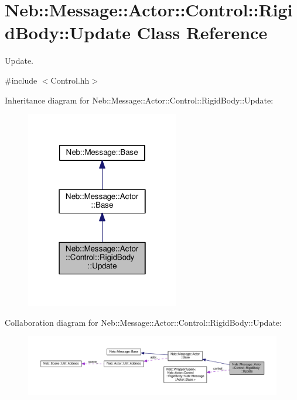 \hypertarget{classNeb_1_1Message_1_1Actor_1_1Control_1_1RigidBody_1_1Update}{\section{Neb\-:\-:Message\-:\-:Actor\-:\-:Control\-:\-:Rigid\-Body\-:\-:Update Class Reference}
\label{classNeb_1_1Message_1_1Actor_1_1Control_1_1RigidBody_1_1Update}
}


Update.  




{\ttfamily \#include $<$Control.\-hh$>$}



Inheritance diagram for Neb\-:\-:Message\-:\-:Actor\-:\-:Control\-:\-:Rigid\-Body\-:\-:Update\-:
\nopagebreak
\begin{figure}[H]
\begin{center}
\leavevmode
\includegraphics[width=190pt]{classNeb_1_1Message_1_1Actor_1_1Control_1_1RigidBody_1_1Update__inherit__graph}
\end{center}
\end{figure}


Collaboration diagram for Neb\-:\-:Message\-:\-:Actor\-:\-:Control\-:\-:Rigid\-Body\-:\-:Update\-:
\nopagebreak
\begin{figure}[H]
\begin{center}
\leavevmode
\includegraphics[width=350pt]{classNeb_1_1Message_1_1Actor_1_1Control_1_1RigidBody_1_1Update__coll__graph}
\end{center}
\end{figure}
